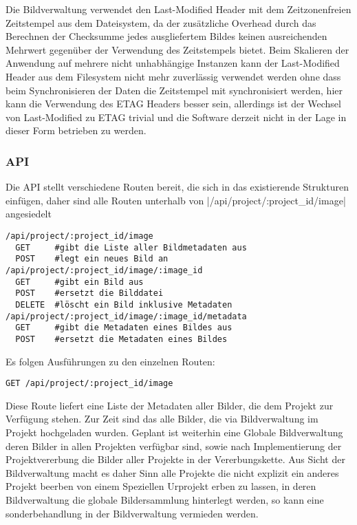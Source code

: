 Die Bildverwaltung verwendet den Last-Modified Header mit dem Zeitzonenfreien
Zeitstempel aus dem Dateisystem, da der zusätzliche Overhead durch das Berechnen
der Checksumme jedes ausgliefertem Bildes keinen ausreichenden Mehrwert
gegenüber der Verwendung des Zeitstempels bietet. Beim Skalieren der Anwendung
auf mehrere nicht unhabhängige Instanzen kann der Last-Modified Header aus dem
Filesystem nicht mehr zuverlässig verwendet werden ohne dass beim
Synchronisieren der Daten die Zeitstempel mit synchronisiert werden, hier kann
die Verwendung des ETAG Headers besser sein, allerdings ist der Wechsel von
Last-Modified zu ETAG trivial und die Software derzeit nicht in der Lage in
dieser Form betrieben zu werden.


\subsubsection{API}

Die API stellt verschiedene Routen bereit, die sich in das existierende
Strukturen einfügen, daher sind alle Routen unterhalb von
|/api/project/:project_id/image| angesiedelt

\begin{verbatim}
/api/project/:project_id/image
  GET     #gibt die Liste aller Bildmetadaten aus
  POST    #legt ein neues Bild an
/api/project/:project_id/image/:image_id
  GET     #gibt ein Bild aus
  POST    #ersetzt die Bilddatei
  DELETE  #löscht ein Bild inklusive Metadaten
/api/project/:project_id/image/:image_id/metadata
  GET     #gibt die Metadaten eines Bildes aus
  POST    #ersetzt die Metadaten eines Bildes
\end{verbatim}

Es folgen Ausführungen zu den einzelnen Routen:

\begin{verbatim}
GET /api/project/:project_id/image
\end{verbatim}

Diese Route liefert eine Liste der Metadaten aller Bilder, die dem Projekt zur
Verfügung stehen. Zur Zeit sind das alle Bilder, die via Bildverwaltung im
Projekt hochgeladen wurden. Geplant ist weiterhin eine Globale Bildverwaltung
deren Bilder in allen Projekten verfügbar sind, sowie nach Implementierung der
Projektvererbung die Bilder aller Projekte in der Vererbungskette. Aus Sicht der
Bildverwaltung macht es daher Sinn alle Projekte die nicht explizit ein anderes
Projekt beerben von einem Speziellen Urprojekt erben zu lassen, in deren
Bildverwaltung die globale Bildersammlung hinterlegt werden, so kann eine
sonderbehandlung in der Bildverwaltung vermieden werden.

